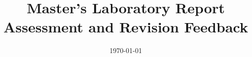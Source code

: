 

\newcommand{\placeholder}[1]{\textit{[#1]}}
\newcommand{\strength}[1]{%
  \par\noindent\textbf{Strength:} #1\par\smallskip}
\newcommand{\observation}[1]{%
  \par\noindent\textbf{Observation:} #1\par\smallskip}
\newcommand{\requiredrevision}[1]{%
  \par\noindent\textbf{\textcolor{feedbackred}{Required revision:}} #1\par\smallskip}
\newcommand{\suggestion}[1]{%
  \par\noindent\textbf{\textcolor{feedbackblue}{Suggested improvement:}} #1\par\smallskip}
\newcommand{\studentresponse}[1]{%
  \par\noindent\textbf{Student response and location of changes:} #1\par\smallskip}
\newcommand{\revisioncheck}[1]{%
  \par\noindent\textbf{Assessor's revision check:} #1\par\medskip}

\newcommand{\mainfeedback}[1]{%
  \refstepcounter{mainfeedback}%
  \subsection*{M\arabic{mainfeedback}. #1}}
\newcommand{\specificfeedback}[2]{%
  \refstepcounter{specificfeedback}%
  \par\medskip\noindent\textbf{D\arabic{specificfeedback}. #1}\par
  #2\par\smallskip}

\title{Master's Laboratory Report\\Assessment and Revision Feedback}
\author{}
\date{\today}


\maketitle
\vspace{-2em}


